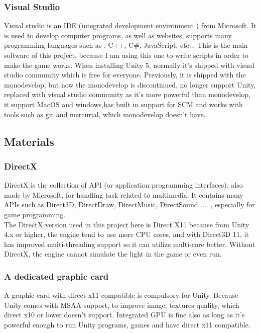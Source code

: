 \documentclass[a4paper, 13pt]{extarticle}
\begin{document}
 		 \subsubsection{Visual Studio}
 		 Visual studio is an IDE (integrated development environment ) from Microsoft. It is used to develop computer programs, as well as websites, supports many programming languages such as : C++, C\#, JavaScript, etc... 
 		 This is the main software of this project, because I am using this one to write scripts in order to make the game works.
 		 When installing Unity 5, normally it's shipped with visual studio community which is free for everyone. Previously, it is shipped with the monodevelop, but now the monodevelop is discontinued, no longer support Unity, replaced with visual studio community as it's more powerful than monodevelop, it support MacOS and windows,has built in support for SCM and works with tools such as git and mercurial, which monodevelop doesn't have.  
 		
 		 
 		 
 		 \subsection{Materials}
 		 \subsubsection{DirectX}
 		 DirectX is the collection of API (or  application programming interfaces), also made by Microsoft, for handling task related to multimedia. It contains many APIs such as Direct3D, DirectDraw, DirectMusic, DirectSound .... , especially for game programming. \\[0.15cm] The DirectX version used in this project here is Direct X11 because from Unity 4.x or higher, the engine tend to use more CPU cores, and with Direct3D 11, it has improved multi-threading support so it can utilize multi-core better. Without DirectX, the engine cannot simulate the light in the game or even run. 
 		 \subsubsection{A dedicated graphic card}
 		 A graphic card with direct x11 compatible is compulsory for Unity. Because Unity comes with MSAA support, to improve image, textures quality, which direct x10 or lower doesn't support. Integrated GPU is fine also as long as it's powerful enough to run Unity programs, games and have direct x11 compatible. 
 		 
\end{document}
